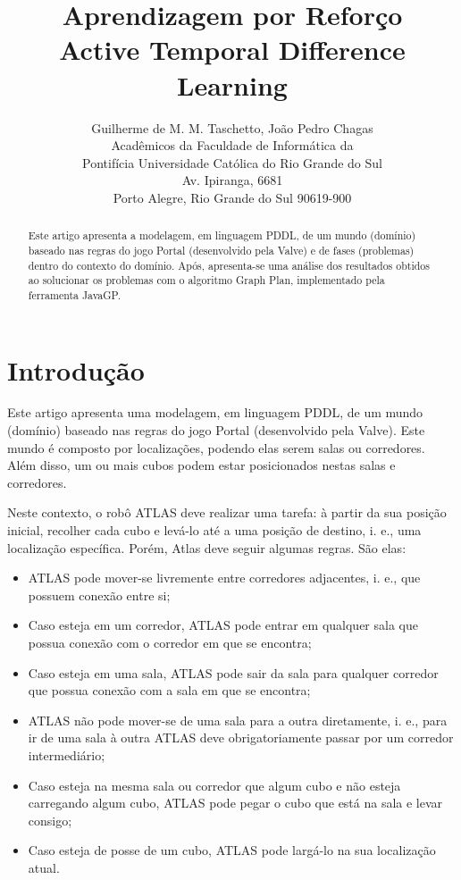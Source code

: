 \documentclass[letterpaper]{article}
\begin{document}
\title{Aprendizagem por Reforço\\Active Temporal Difference Learning}
\author{Guilherme de M. M. Taschetto, João Pedro Chagas\\
Acadêmicos da Faculdade de Informática da\\
Pontifícia Universidade Católica do Rio Grande do Sul\\
Av. Ipiranga, 6681\\
Porto Alegre, Rio Grande do Sul 90619-900}

\maketitle
\begin{abstract}
Este artigo apresenta a modelagem, em linguagem PDDL, de um mundo (domínio) baseado nas regras do jogo Portal
(desenvolvido pela Valve) e de fases (problemas) dentro do contexto do domínio. Após, apresenta-se uma análise dos
resultados obtidos ao solucionar os problemas com o algoritmo Graph Plan, implementado pela ferramenta JavaGP.
\end{abstract}

\section{Introdução}

Este artigo apresenta uma modelagem, em linguagem PDDL, de um mundo (domínio) baseado nas regras do jogo Portal
(desenvolvido pela Valve). Este mundo é composto por localizações, podendo elas serem salas ou corredores. Além disso,
um ou mais cubos podem estar posicionados nestas salas e corredores.

Neste contexto, o robô ATLAS deve realizar uma tarefa: à partir da sua posição inicial, recolher cada cubo e levá-lo
até a uma posição de destino, i. e., uma localização específica. Porém, Atlas deve seguir algumas regras. São elas:

\begin{itemize}
\item ATLAS pode mover-se livremente entre corredores adjacentes, i. e., que possuem conexão entre si;
\item Caso esteja em um corredor, ATLAS pode entrar em qualquer sala que possua conexão com o corredor em que se encontra;
\item Caso esteja em uma sala, ATLAS pode sair da sala para qualquer corredor que possua conexão com a sala em que se encontra;
\item ATLAS não pode mover-se de uma sala para a outra diretamente, i. e., para ir de uma sala à outra ATLAS deve obrigatoriamente passar por um corredor intermediário;
\item Caso esteja na mesma sala ou corredor que algum cubo e não esteja carregando algum cubo, ATLAS pode pegar o cubo que está na sala e levar consigo;
\item Caso esteja de posse de um cubo, ATLAS pode largá-lo na sua localização atual.
\end{itemize}
\end{document}
